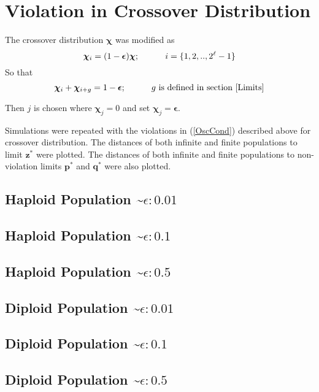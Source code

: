 \section{Violation in Crossover Distribution}
The crossover distribution $\bm{\chi}$ was modified as
\[
\bm{\chi}_i = (1-\bm{\epsilon}) \bm{\chi} ; \hspace{30pt} i = \{1, 2,.., 2^{\ell}-1\} 
\]
So that 
\[
\bm{\chi}_i + \bm{\chi}_{i+g} = 1-\bm{\epsilon} ; \hspace{30pt} g \text{ is defined in  section } \ref{Limits}
\]

Then $j$ is chosen where $\bm{\chi}_j = 0$ and set $\bm{\chi}_j = \bm{\epsilon}$. 

Simulations were repeated with the violations in (\ref{OscCond}) described above for crossover distribution.
The distances of both infinite and finite populations to limit $\bm{z}^\ast$ were plotted. 
The distances of both infinite and finite populations to non-violation limits $\bm{p}^\ast$ and $\bm{q}^\ast$ were also plotted.

\subsection{Haploid Population \textasciitilde $\epsilon: 0.01$}

\subsection{Haploid Population \textasciitilde $\epsilon: 0.1$}

\subsection{Haploid Population \textasciitilde $\epsilon: 0.5$}


\subsection{Diploid Population \textasciitilde $\epsilon: 0.01$}

\subsection{Diploid Population \textasciitilde $\epsilon: 0.1$}

\subsection{Diploid Population \textasciitilde $\epsilon: 0.5$}


